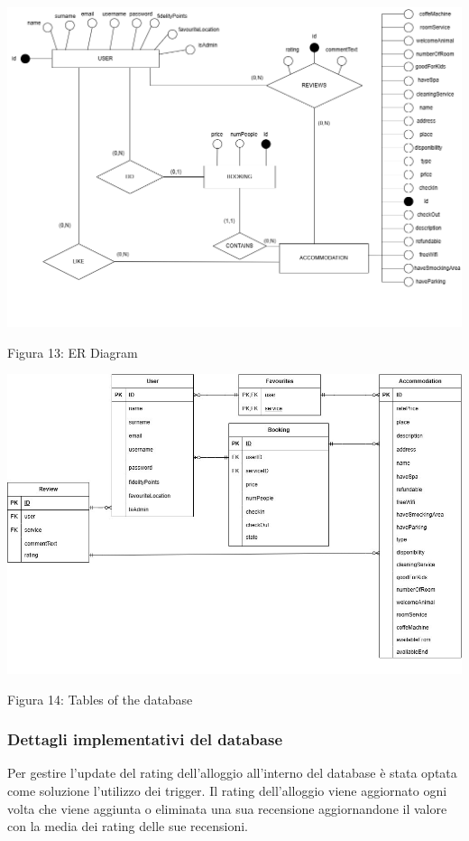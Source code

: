 \documentclass[10pt]{article}
\begin{document}
\begin{center}
\par\medskip
\hspace*{-2cm}
\includegraphics[scale=0.41]{ERimages/FinalER}
\par\medskip
Figura 13: ER Diagram
\par\medskip
\includegraphics[scale=0.5]{ERimages/schemaLogicoDBTabelle}
\par\medskip
Figura 14: Tables of the database
\par\medskip
\end{center}

\subsubsection{Dettagli implementativi del database}

Per gestire l'update del rating dell'alloggio all'interno del database \`e stata optata come soluzione l'utilizzo dei trigger. Il rating dell'alloggio viene aggiornato ogni volta che viene aggiunta o eliminata una sua recensione aggiornandone il valore con la media dei rating delle sue recensioni.
\end{document}
